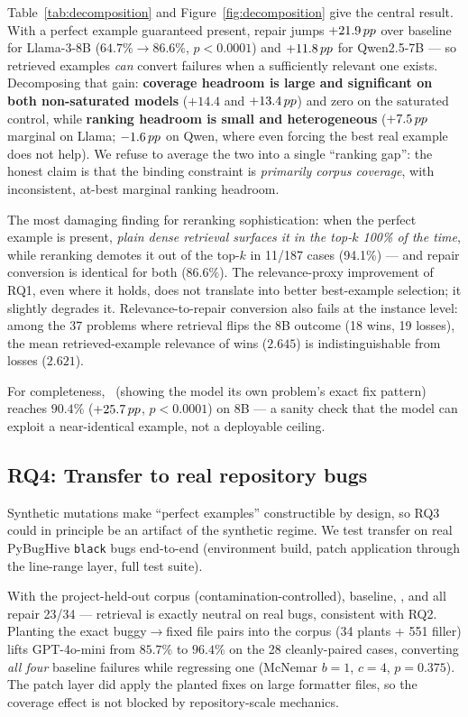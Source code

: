 Table~\ref{tab:decomposition} and Figure~\ref{fig:decomposition} give the
central result. With a perfect example guaranteed present, repair jumps $+21.9\,pp$ over baseline for
Llama-3-8B ($64.7\%{\to}86.6\%$, $p{<}0.0001$) and $+11.8\,pp$ for Qwen2.5-7B
--- so retrieved examples \emph{can} convert failures when a sufficiently
relevant one exists. Decomposing that gain: \textbf{coverage headroom is
large and significant on both non-saturated models} ($+14.4$ and $+13.4\,pp$)
and zero on the saturated control, while \textbf{ranking headroom is small
and heterogeneous} ($+7.5\,pp$ marginal on Llama; $-1.6\,pp$ on Qwen, where
even forcing the best real example does not help). We refuse to average the
two into a single ``ranking gap'': the honest claim is that the binding
constraint is \emph{primarily corpus coverage}, with inconsistent, at-best
marginal ranking headroom.

The most damaging finding for reranking sophistication: when the perfect
example is present, \emph{plain dense retrieval surfaces it in the top-$k$
100\% of the time}, while \structured reranking demotes it out of the top-$k$
in 11/187 cases (94.1\%) --- and repair conversion is identical for both
($86.6\%$). The relevance-proxy improvement of RQ1, even where it holds,
does not translate into better best-example selection; it slightly degrades
it. Relevance-to-repair conversion also fails at the instance level: among
the 37 problems where retrieval flips the 8B outcome (18 wins, 19 losses),
the mean retrieved-example relevance of wins ($2.645$) is indistinguishable
from losses ($2.621$).

For completeness, \oracleself\ (showing the model its own problem's exact
fix pattern) reaches $90.4\%$ ($+25.7\,pp$, $p{<}0.0001$) on 8B --- a sanity
check that the model can exploit a near-identical example, not a deployable
ceiling.

\subsection{RQ4: Transfer to real repository bugs}
\label{sec:results-transfer}

Synthetic mutations make ``perfect examples'' constructible by design, so RQ3
could in principle be an artifact of the synthetic regime. We test transfer
on real PyBugHive \texttt{black} bugs end-to-end (environment build, patch
application through the line-range layer, full test suite).

With the project-held-out corpus (contamination-controlled), baseline,
\codeonly, and \structured all repair 23/34 --- retrieval is exactly neutral
on real bugs, consistent with RQ2. Planting the exact buggy$\to$fixed file
pairs into the corpus (34 plants + 551 filler) lifts GPT-4o-mini from
$85.7\%$ to $96.4\%$ on the 28 cleanly-paired cases, converting \emph{all
four} baseline failures while regressing one (McNemar $b{=}1$, $c{=}4$,
$p{=}0.375$). The patch layer did apply the planted fixes on large formatter
files, so the coverage effect is not blocked by repository-scale mechanics.

